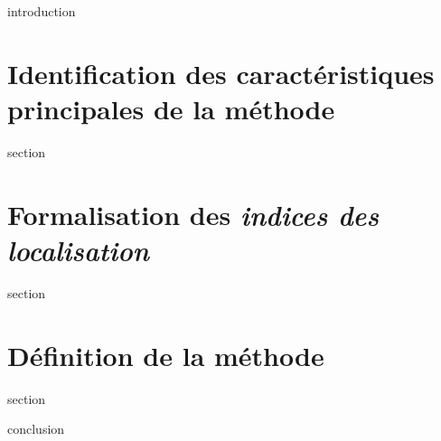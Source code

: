 \chaptertoc{}

\label{sec:4-int}
{introduction}

\section{Identification des caractéristiques principales de la
  méthode}
\label{sec:4-1}
{section}

\section{Formalisation des \emph{indices des localisation}}
\label{sec:4-2}
{section}

\section{Définition de la méthode}
\label{sec:4-3}
{section}

\label{sec:4-cnc}
{conclusion}

